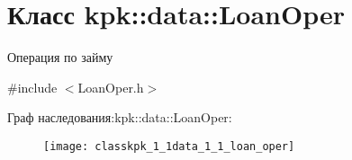 \hypertarget{classkpk_1_1data_1_1_loan_oper}{}\section{Класс kpk\+:\+:data\+:\+:Loan\+Oper}
\label{classkpk_1_1data_1_1_loan_oper}


Операция по займу  




{\ttfamily \#include $<$Loan\+Oper.\+h$>$}

Граф наследования\+:kpk\+:\+:data\+:\+:Loan\+Oper\+:\begin{figure}[H]
\begin{center}
\leavevmode
\texttt{[image: classkpk\_1\_1data\_1\_1\_loan\_oper]}
\end{center}
\end{figure}
